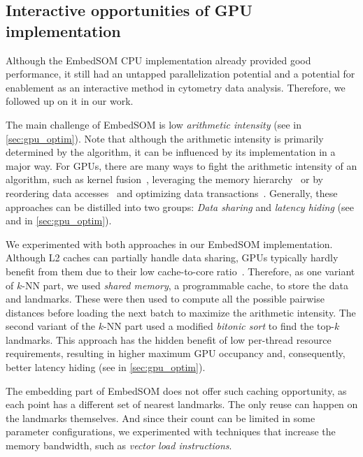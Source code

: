 \subsection{Interactive opportunities of GPU implementation}

Although the EmbedSOM CPU implementation already provided good performance, it still had an untapped parallelization potential and a potential for enablement as an interactive method in cytometry data analysis. Therefore, we followed up on it in our work.

The main challenge of EmbedSOM is low \emph{arithmetic intensity} (see  in \cref{sec:gpu_optim}). Note that although the arithmetic intensity is primarily determined by the algorithm, it can be influenced by its implementation in a major way. For GPUs, there are many ways to fight the arithmetic intensity of an algorithm, such as kernel fusion~\cite{wahib2014scalable}, leveraging the memory hierarchy~\cite{lee2012cuda} or by reordering data accesses~\cite{ghysels2012improving} and optimizing data transactions~\cite{lu2020optimizing}. Generally, these approaches can be distilled into two groups: \emph{Data sharing} and \emph{latency hiding} (see  and  in \cref{sec:gpu_optim}).

We experimented with both approaches in our EmbedSOM implementation. Although L2 caches can partially handle data sharing, GPUs typically hardly benefit from them due to their low cache-to-core ratio~\cite{site:cuda}. Therefore, as one variant of $k$-NN part, we used \emph{shared memory}, a programmable cache, to store the data and landmarks. These were then used to compute all the possible pairwise distances before loading the next batch to maximize the arithmetic intensity. The second variant of the $k$-NN part used a modified \emph{bitonic sort} to find the top-$k$ landmarks. This approach has the hidden benefit of low per-thread resource requirements, resulting in higher maximum GPU occupancy and, consequently, better latency hiding  (see  in \cref{sec:gpu_optim}).

The embedding part of EmbedSOM does not offer such caching opportunity, as each point has a different set of nearest landmarks. The only reuse can happen on the landmarks themselves. And since their count can be limited in some parameter configurations, we experimented with techniques that increase the memory bandwidth, such as \emph{vector load instructions}.

